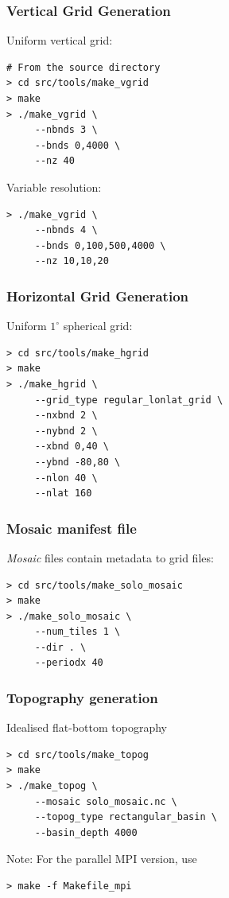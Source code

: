 \documentclass[red]{beamer}
\begin{document}
\begin{frame}[fragile]
    \frametitle{Vertical Grid Generation}
    
    Uniform vertical grid:
    \begin{lstlisting}
# From the source directory
> cd src/tools/make_vgrid
> make
> ./make_vgrid \
     --nbnds 3 \
     --bnds 0,4000 \
     --nz 40
    \end{lstlisting}
    
    Variable resolution:
    \begin{lstlisting}
> ./make_vgrid \
     --nbnds 4 \
     --bnds 0,100,500,4000 \
     --nz 10,10,20
    \end{lstlisting}
\end{frame}
\begin{frame}[fragile]
    \frametitle{Horizontal Grid Generation}
   
    Uniform $1^\circ$ spherical grid:
    \begin{lstlisting}
> cd src/tools/make_hgrid
> make
> ./make_hgrid \
     --grid_type regular_lonlat_grid \
     --nxbnd 2 \
     --nybnd 2 \
     --xbnd 0,40 \
     --ybnd -80,80 \
     --nlon 40 \
     --nlat 160
    \end{lstlisting}
\end{frame}

\begin{frame}[fragile]
    \frametitle{Mosaic manifest file}
    
    \textit{Mosaic} files contain metadata to grid files:
    \begin{lstlisting}
> cd src/tools/make_solo_mosaic
> make
> ./make_solo_mosaic \
     --num_tiles 1 \
     --dir . \
     --periodx 40
    \end{lstlisting}
\end{frame}

\begin{frame}[fragile]
    \frametitle{Topography generation}
   
    Idealised flat-bottom topography
    \begin{lstlisting}
> cd src/tools/make_topog
> make
> ./make_topog \
     --mosaic solo_mosaic.nc \
     --topog_type rectangular_basin \
     --basin_depth 4000
    \end{lstlisting}

    Note: For the parallel MPI version, use
    \begin{lstlisting}
> make -f Makefile_mpi
    \end{lstlisting}
\end{frame}
\end{document}
